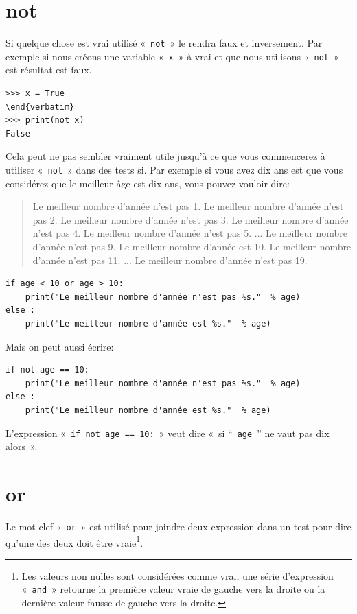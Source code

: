 \section*{not}
Si quelque chose est vrai utilisé «~\texttt{not}~» le rendra faux et inversement. Par exemple si nous créons une variable «~\texttt{x}~»  à vrai et que nous utilisons «~\texttt{not}~» est résultat est faux.
\begin{Verbatim}[frame=single,rulecolor=\color{gray}]
>>> x = True
\end{verbatim}
>>> print(not x)
False
\end{Verbatim}

Cela peut ne pas sembler vraiment utile jusqu'à ce que vous commencerez à utiliser «~\texttt{not}~»  dans des tests si. Par exemple si vous avez dix ans est que vous considérez que le meilleur âge est dix ans, vous pouvez vouloir dire:

\begin{quotation}
Le meilleur nombre d'année n'est pas 1.
Le meilleur nombre d'année n'est pas 2.
Le meilleur nombre d'année n'est pas 3.
Le meilleur nombre d'année n'est pas 4.
Le meilleur nombre d'année n'est pas 5.
...
Le meilleur nombre d'année n'est pas 9.
Le meilleur nombre d'année est 10.
Le meilleur nombre d'année n'est pas 11.
...
Le meilleur nombre d'année n'est pas 19.
\end{quotation}

\begin{Verbatim}[frame=single,rulecolor=\color{gray}]
if age < 10 or age > 10:
    print("Le meilleur nombre d'année n'est pas %s."  % age)
else :
    print("Le meilleur nombre d'année est %s."  % age)
\end{Verbatim}

Mais on peut aussi écrire:

\begin{Verbatim}[frame=single,rulecolor=\color{gray}]
if not age == 10:
    print("Le meilleur nombre d'année n'est pas %s."  % age)
else :
    print("Le meilleur nombre d'année est %s."  % age)
\end{Verbatim}

L'expression «~\texttt{if not age == 10:}~» veut dire «~si “~\texttt{age}~” ne vaut pas dix alors~».


\section*{or}

Le mot clef «~\texttt{or}~» est utilisé pour joindre deux expression dans un test pour dire qu'une des deux doit être vraie\footnote{Les valeurs non nulles sont considérées comme vrai, une série d'expression «~\texttt{and}~» retourne la première valeur vraie de gauche vers la droite ou la  dernière valeur fausse de gauche vers la droite.}.

